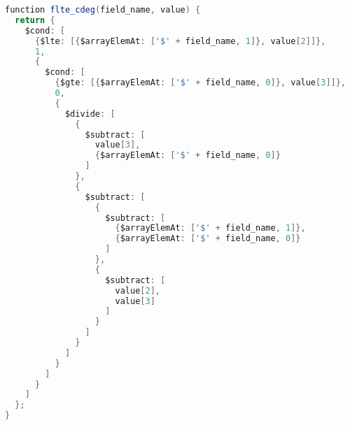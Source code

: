 \begin{lstlisting}[language=java, escapechar=|]
function flte_cdeg(field_name, value) {
  return {
    $cond: [
      {$lte: [{$arrayElemAt: ['$' + field_name, 1]}, value[2]]},
      1,
      {
        $cond: [
          {$gte: [{$arrayElemAt: ['$' + field_name, 0]}, value[3]]},
          0,
          {
            $divide: [
              {
                $subtract: [
                  value[3],
                  {$arrayElemAt: ['$' + field_name, 0]}
                ]
              },
              {
                $subtract: [
                  {
                    $subtract: [
                      {$arrayElemAt: ['$' + field_name, 1]},
                      {$arrayElemAt: ['$' + field_name, 0]}
                    ]
                  },
                  {
                    $subtract: [
                      value[2],
                      value[3]
                    ]
                  }
                ]
              }
            ]
          }
        ]
      }
    ]
  };
}


\end{lstlisting}
